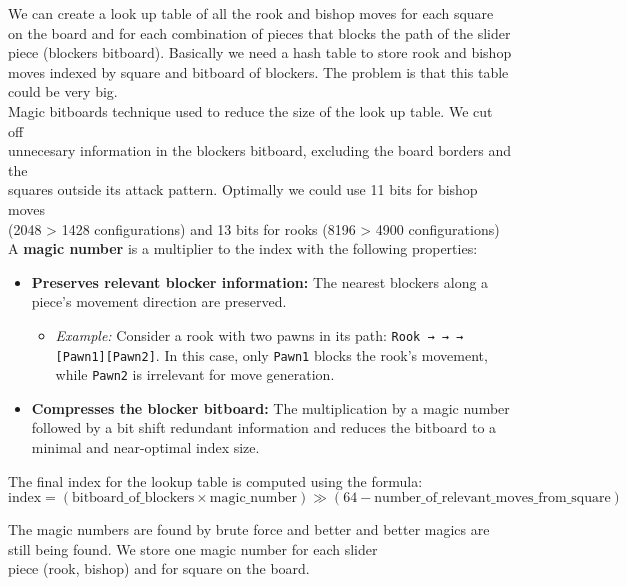 We can create a look up table of all the rook and bishop moves for each square\\
on the board and for each combination of pieces that blocks the path of the slider\\
piece (blockers  bitboard). Basically we need a hash table to store rook and bishop\\
moves indexed by square and bitboard of blockers. The problem is that this table\\
could be very big.\\

Magic bitboards technique used to reduce the size of the look up table.  We cut off\\
unnecesary information in the blockers bitboard, excluding the board borders and the\\
squares outside its attack pattern. Optimally we could use 11 bits for bishop moves\\
(2048 > 1428 configurations) and 13 bits for rooks (8196 > 4900 configurations)\\

A \textbf{magic number} is a multiplier to the index with the following properties:

\begin{itemize}
  \item \textbf{Preserves relevant blocker information:} 
  The nearest blockers along a piece’s movement direction are preserved. 
  \begin{itemize}
    \item \textit{Example:} Consider a rook with two pawns in its path: \texttt{Rook → → → [Pawn1][Pawn2]}. In this case, only \texttt{Pawn1} blocks the rook's movement, while \texttt{Pawn2} is irrelevant for move generation.
  \end{itemize}
  
  \item \textbf{Compresses the blocker bitboard:} 
  The multiplication by a magic number followed by a bit shift redundant information and reduces the bitboard to a minimal and near-optimal index size.
\end{itemize}

\noindent The final index for the lookup table is computed using the formula:
\[
\text{index} = (\text{bitboard\_of\_blockers} \times \text{magic\_number}) \gg (64 - \text{number\_of\_relevant\_moves\_from\_square})
\]

The magic numbers are found by brute force and better and better magics are\\
still being found. We store one magic number for each slider\\
piece (rook, bishop) and for square on the board.\\

